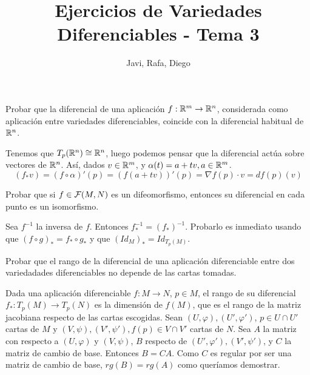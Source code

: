 \documentclass[twoside]{article}
\newcounter{ejercicio}
\begin{document}
\title{Ejercicios de Variedades Diferenciables - Tema 3}
\author{Javi, Rafa, Diego}
\maketitle

\begin{ejercicio}{1}
Probar que la diferencial de una aplicación $f : \mathbb{R}^m \to \mathbb{R}^n$, considerada
como aplicación entre variedades diferenciables, coincide con la diferencial
habitual de $\mathbb{R}^n$.
\end{ejercicio}
\begin{solucion}
Tenemos que $T_p(\mathbb{R}^n)\cong \mathbb{R}^n$, luego podemos pensar que la diferencial actúa sobre vectores de $\mathbb{R}^n$. Así, dados $v\in\mathbb{R}^m$, y $\alpha(t)=a+tv, a\in\mathbb{R}^m$. 
$$(f_*v)=(f\circ \alpha)'(p)=(f(a+tv))'(p)=\nabla f(p)\cdot v=df(p)(v)$$
\end{solucion}

\newpage

\begin{ejercicio}{2}
Probar que si $f \in \mathcal{F}(M,N)$ es un difeomorfismo, entonces su diferencial en
cada punto es un isomorfismo.
\end{ejercicio}
\begin{solucion}
Sea $f^{-1}$ la inversa de $f$. Entonces $f^{-1}_*=(f_*)^{-1}$. Probarlo es inmediato usando que $(f\circ g)_*=f_*\circ g_*$ y que $(Id_M)_*=Id_{T_p(M)}$.
\end{solucion}


\newpage

\begin{ejercicio}{3}
Probar que el rango de la diferencial de una aplicación diferenciable entre
dos variedadades diferenciables no depende de las cartas tomadas.
\end{ejercicio}
\begin{solucion}
Dada una aplicación diferenciable $f:M\to N$, $p\in M$, el rango de su diferencial $f_*:T_p(M)\to T_p(N)$ es la dimensión de $f(M)$, que es el rango de la matriz jacobiana respecto de las cartas escogidas. Sean $(U,\varphi), (U',\varphi')$, $p\in U\cap U'$ cartas de $M$ y $(V,\psi),(V',\psi'),f(p)\in V\cap V'$ cartas de $N$. Sea $A$ la matriz con respecto a $(U,\varphi)$ y $(V,\psi)$, $B$ respecto de $(U',\varphi'),(V',\psi')$, y $C$ la matriz de cambio de base. Entonces $B=CA$. Como $C$ es regular por ser una matriz de cambio de base, $rg(B)=rg(A)$ como queríamos demostrar.
\end{solucion}
\end{document}
